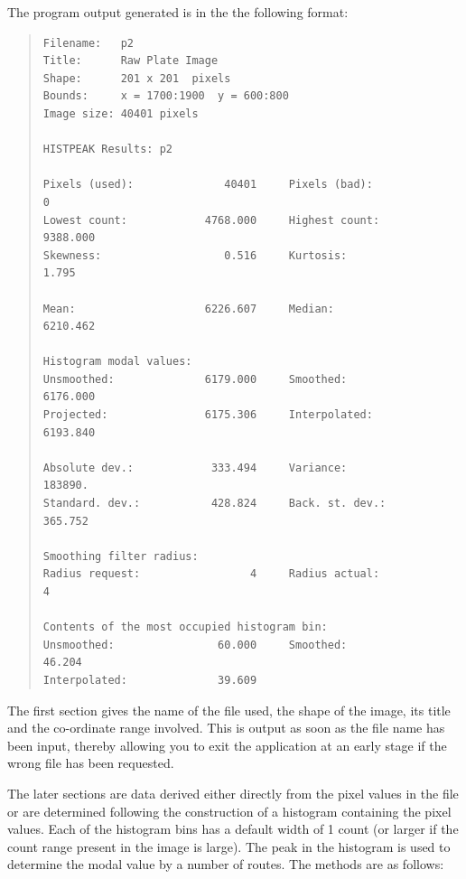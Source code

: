 \documentclass[twoside,11pt]{article}
\newenvironment{myquote}{\begin{quote}\begin{small}}{\end{small}\end{quote}}
\begin{document}
The program output generated is in the the following format:

\begin{myquote}
\begin{verbatim}
Filename:   p2
Title:      Raw Plate Image
Shape:      201 x 201  pixels
Bounds:     x = 1700:1900  y = 600:800
Image size: 40401 pixels

HISTPEAK Results: p2

Pixels (used):              40401     Pixels (bad):                0
Lowest count:            4768.000     Highest count:        9388.000
Skewness:                   0.516     Kurtosis:                1.795

Mean:                    6226.607     Median:               6210.462

Histogram modal values:
Unsmoothed:              6179.000     Smoothed:             6176.000
Projected:               6175.306     Interpolated:         6193.840

Absolute dev.:            333.494     Variance:              183890.
Standard. dev.:           428.824     Back. st. dev.:        365.752

Smoothing filter radius:
Radius request:                 4     Radius actual:               4

Contents of the most occupied histogram bin:
Unsmoothed:                60.000     Smoothed:               46.204
Interpolated:              39.609
\end{verbatim}
\end{myquote}

The first section gives the name of the file used, the shape of the image,
its title and the co-ordinate range involved. This is output as soon as
the file name has been input, thereby allowing you to exit the application
at an early stage if the wrong file has been requested.

The later sections are data derived either directly from the pixel values
in the file or are determined following the construction of a histogram
containing the pixel values. Each of the histogram bins has a default
width of 1 count (or larger if the count range present in the image is large).
The peak in the histogram is used to determine the modal
value by a number of routes. The methods are as follows:
\end{document}
